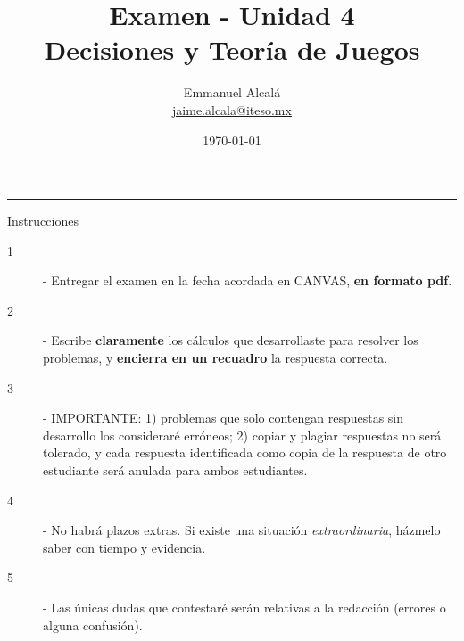 \documentclass[12pt]{scrartcl} %
\title{Examen - Unidad 4 \\ \normalsize Decisiones y Teoría de Juegos}
\author{Emmanuel Alcalá\\ \url{jaime.alcala@iteso.mx}}
\date{\today}
\begin{document}
\maketitle
\hrule

\begin{summarybox}{Instrucciones}

  \begin{description}
    \item[1] - Entregar el examen en la fecha acordada en CANVAS, \textbf{\color{blue} en formato pdf}. %
    \item[2] - Escribe \textbf{claramente} los cálculos que desarrollaste para resolver los problemas, y \textbf{encierra en un recuadro} la respuesta correcta.
    \item[3] - {\color{blue} IMPORTANTE}: 1) problemas que solo contengan respuestas sin desarrollo los consideraré {\color{red} erróneos}; 2) copiar y plagiar respuestas no será tolerado, y cada respuesta identificada como copia de la respuesta de otro estudiante será {\color{red} anulada} para ambos estudiantes.
    \item[4] - No habrá plazos extras. Si existe una situación \textit{extraordinaria}, házmelo saber con tiempo y evidencia.
    \item[5] - Las únicas dudas que contestaré serán relativas a la redacción (errores o alguna confusión). %
  \end{description}

\end{summarybox}

\begin{center}
  \Coffeecup[1.5]
\end{center}
\end{document}
